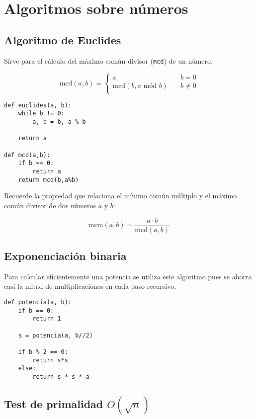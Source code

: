 \documentclass[12pt,letterpaper]{article}
\begin{document}
\section{Algoritmos sobre números}

\subsection{Algoritmo de Euclides}

Sirve para el cálculo del máximo común divisor (\texttt{mcd}) de un número.

\begin{equation*}
\text{mcd}(a,b) =
     \begin{cases}
       \text{a} & \quad b = 0 \\
       \text{mcd}(b, a \text{ mód }b) &\quad b \neq 0 \\
     \end{cases}
\end{equation*}

\begin{verbatim}
def euclides(a, b):
    while b != 0:
        a, b = b, a % b

    return a

def mcd(a,b):
    if b == 0:
        return a
    return mcd(b,a%b)
\end{verbatim}

Recuerde la propiedad que relaciona el mínimo común múltiplo y el máximo común divisor de dos números $a$ y $b$:

\begin{equation*}
    \text{mcm}(a,b) = \frac{a \cdot b}{\text{mcd}(a,b)}
\end{equation*}

\subsection{Exponenciación binaria}

Para calcular eficientemente una potencia se utiliza este algoritmo pues se ahorra casi la mitad de multiplicaciones en cada paso recursivo.

\begin{verbatim}
def potencia(a, b):
	if b == 0:
		return 1

	s = potencia(a, b//2)

	if b % 2 == 0:
		return s*s
	else:
		return s * s * a
\end{verbatim}

\subsection{Test de primalidad \texorpdfstring{$O(\sqrt{n})$}{O(√n)}}
\end{document}
